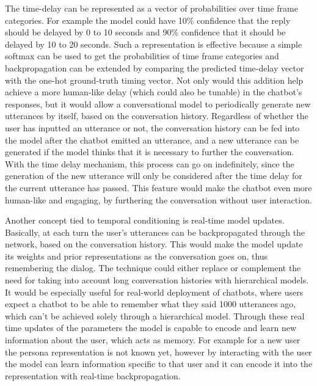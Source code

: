 \documentclass[12pt]{article}
\begin{document}
The time-delay can be represented as a vector of probabilities over time frame categories. For example the model could have 10\% confidence that the reply should be delayed by 0 to 10 seconds and 90\% confidence that it should be delayed by 10 to 20 seconds. Such a representation is effective because a simple softmax can be used to get the probabilities of time frame categories and backpropagation can be extended by comparing the predicted time-delay vector with the one-hot ground-truth timing vector. Not only would this addition help achieve a more human-like delay (which could also be tunable) in the chatbot's responses, but it would allow a conversational model to periodically generate new utterances by itself, based on the conversation history. Regardless of whether the user has inputted an utterance or not, the conversation history can be fed into the model after the chatbot emitted an utterance, and a new utterance can be generated if the model thinks that it is necessary to further the conversation. With the time delay mechanism, this process can go on indefinitely, since the generation of the new utterance will only be considered after the time delay for the current utterance has passed. This feature would make the chatbot even more human-like and engaging, by furthering the conversation without user interaction.

Another concept tied to temporal conditioning is real-time model updates. Basically, at each turn the user's utterances can be backpropagated through the network, based on the conversation history. This would make the model update its weights and prior representations as the conversation goes on, thus remembering the dialog. The technique could either replace or complement the need for taking into account long conversation histories with hierarchical models. It would be especially useful for real-world deployment of chatbots, where users expect a chatbot to be able to remember what they said 1000 utterances ago, which can't be achieved solely through a hierarchical model. Through these real time updates of the parameters the model is capable to encode and learn new information about the user, which acts as memory. For example for a new user the persona representation is not known yet, however by interacting with the user the model can learn information specific to that user and it can encode it into the representation with real-time backpropagation.
\end{document}
